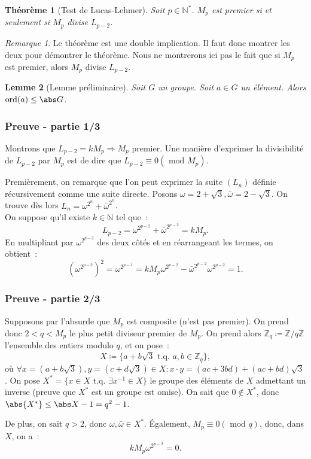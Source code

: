 \documentclass[10pt, mathserif]{beamer}
\DeclareMathOperator{\ord}{ord}
\newcommand{\tq}{\text{ t.q. }}
\newcommand{\Z}{\mathbb Z}
\newcommand{\N}{\mathbb N}
\renewcommand{\mod}{\mbox{ mod }}
\newtheorem{thm}{Théorème}[section]
\newtheorem{lem}[thm]{Lemme}
\theoremstyle{definition}
\theoremstyle{remark}
\newtheorem*{rmq}{Remarque}
\begin{document}
	\begin{frame}
		\begin{thm}[Test de Lucas-Lehmer]
			Soit $p \in \N^*$. $M_p$ est premier si et seulement si $M_p$ divise $L_{p-2}$.
		\end{thm}

		\begin{rmq}
			Le théorème est une double implication. Il faut donc montrer les deux pour démontrer le théorème. Nous ne montrerons ici pas le fait que si $M_p$
			est premier, alors $M_p$ divise $L_{p-2}$.
		\end{rmq}

		\begin{lem}[Lemme préliminaire]
			Soit $G$ un groupe. Soit $a \in G$ un élément. Alors $\ord(a) \leq \abs G$.
		\end{lem}
	\end{frame}

	\begin{frame}
		\frametitle{Preuve - partie 1/3}

		Montrons que $L_{p-2} = kM_p \Rightarrow M_p$ premier. Une manière d'exprimer la divisibilité de $L_{p-2}$ par $M_p$ est de dire que
		$L_{p-2} \equiv 0 (\mod M_p)$.

		Premièrement, on remarque que l'on peut exprimer la suite $(L_n)$ définie récursivement comme une suite directe. Posons
		$\omega = 2 + \sqrt 3, \bar \omega = 2 - \sqrt 3$. On trouve dès lors $L_n = \omega^{2^n} + \bar \omega^{2^n}$. \\

		On suppose qu'il existe $k \in \N$ tel que~:
		\[L_{p-2} = \omega^{2^{p-2}} + \bar \omega^{2^{p-2}} = kM_p.\]
		En multipliant par $\omega^{2^{p-2}}$ des deux côtés et en réarrangeant les termes, on obtient~:
		\[\left(\omega^{2^{p-2}}\right)^2 = \omega^{2^{p-1}} = kM_p\omega^{2^{p-2}} - \bar \omega^{2^{p-2}}\omega^{2^{p-2}} = 1.\]
	\end{frame}

	\begin{frame}
		\frametitle{Preuve - partie 2/3}

		Supposons par l'absurde que $M_p$ est composite (n'est pas premier). On prend donc $2 < q < M_p$ le plus petit diviseur premier de $M_p$. On prend
		alors $\Z_q \coloneqq \Z/q\Z$ l'ensemble des entiers modulo $q$, et on pose~:
		\[X \coloneqq \{a + b\sqrt 3 \tq a, b \in \Z_q\},\]
		où $\forall x = (a+b\sqrt 3), y = (c+d\sqrt 3) \in X : x \cdot y = (ac+3bd) + (ac+bd)\sqrt 3$. On pose $X^* = \{x \in X \tq \exists x^{-1} \in X\}$
		le groupe des éléments de $X$ admettant un inverse (preuve que $X^*$ est un groupe est omise). On sait que $0 \not \in X^*$, donc $\abs {X^*} \leq \abs X -1=q^2 - 1$.

		De plus, on sait $q > 2$, donc $\omega, \bar \omega \in X^*$. Également, $M_p \equiv 0 (\mod q)$, donc, dans $X$, on a~:
		\[kM_p\omega^{2^{p-2}} = 0.\]
	\end{frame}
	
\end{document}
